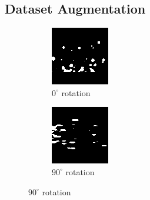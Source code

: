 \documentclass[10pt,twocolumn,letterpaper]{article}
\begin{document}
\subsection{Dataset Augmentation}

\begin{figure}[H]
  \centering
  \begin{subfigure}{.33\linewidth}
    \includegraphics[width=\linewidth]{img_aug}
    \caption{$0^\circ$ rotation}
    \label{fig:img_aug_0}
  \end{subfigure}
  \qquad
  \begin{subfigure}{0.33\linewidth}
    \includegraphics[width=\linewidth]{img_aug_rot_90}
    \caption{$90^\circ$ rotation}
    \label{fig:img_aug_90}
  \end{subfigure}
  

\end{figure}
\end{document}
